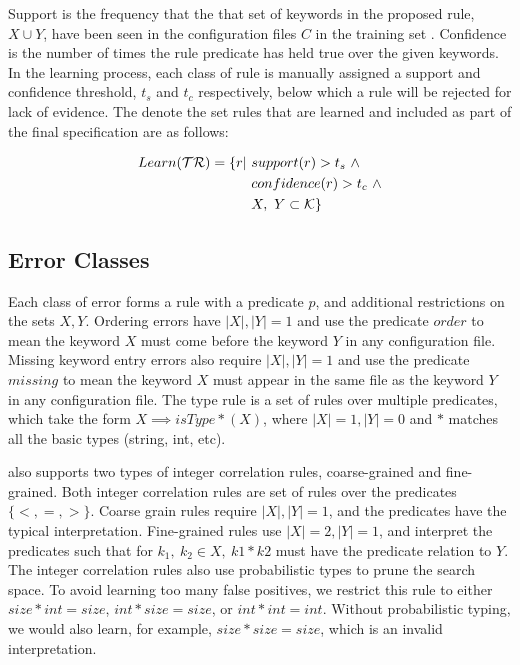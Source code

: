 Support is the frequency that the that set of keywords in the proposed rule, $X \cup Y$, have been seen in the configuration files $C$ in the training set \trainingSet.
Confidence is the number of times the rule predicate has held true over the given keywords.
In the learning process, each class of rule is manually assigned a support and confidence threshold, $t_s$ and $t_c$ respectively, below which a rule will be rejected for lack of evidence.
The denote the set rules that are learned and included as part of the final specification are as follows:

\begin{align}
Learn(\mathcal{TR}) = \{r | \ &support(r) > t_s\ \land \nonumber \\
    & confidence(r) > t_c\ \land \label{eq:learn}\\ 
    & X,\ Y \subset \mathcal{K}\} \nonumber
\end{align}

\subsection{Error Classes}
Each class of error forms a rule with a predicate $p$, and additional restrictions on the sets $X, Y$.
Ordering errors have $|X|, |Y| = 1$ and use the predicate $order$ to mean the keyword $X$ must come before the keyword $Y$ in any configuration file.
Missing keyword entry errors also require $|X|, |Y| = 1$ and use the predicate $missing$ to mean the keyword $X$ must appear in the same file as the keyword $Y$ in any configuration file.
The type rule is a set of rules over multiple predicates, which take the form $X \implies isType\ast(X)$, where $|X|=1, |Y|=0$ and $\ast$ matches all the basic types (string, int, etc).

\app also supports two types of integer correlation rules, coarse-grained and fine-grained.
Both integer correlation rules are set of rules over the predicates $\{<,=,>\}$.
Coarse grain rules require $|X|, |Y| = 1$, and the predicates have the typical interpretation.
Fine-grained rules use $|X|=2,|Y|=1$, and interpret the predicates such that for $k_1,\ k_2 \in X,\ k1*k2$ must have the predicate relation to $Y$.
The integer correlation rules also use probabilistic types to prune the search space.
To avoid learning too many false positives, we restrict this rule to either $size*int=size$, $int*size=size$, or $int*int = int$.
Without probabilistic typing, we would also learn, for example, $size*size=size$, which is an invalid interpretation.

